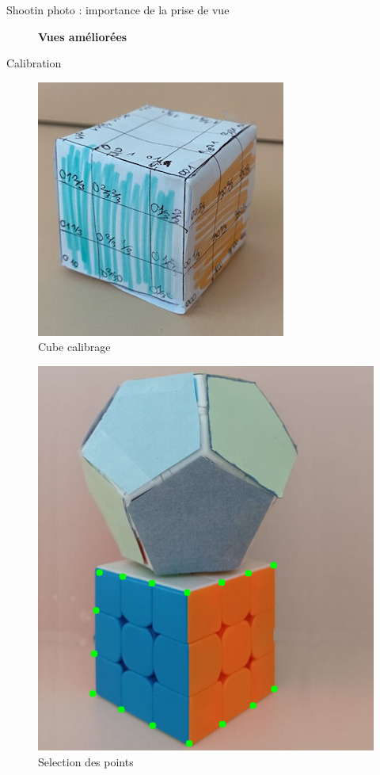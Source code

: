 \begin{frame}{Shootin photo : importance de la prise de vue}
\begin{minipage}{0.48\linewidth}
\begin{figure}
      {\footnotesize\textbf{Vues améliorées}}
    \end{figure}
  \end{minipage}
\end{frame}


\begin{frame}{Calibration}
 \centering
  \begin{minipage}{0.48\linewidth}
    \centering
    \begin{figure}
      \centering
      \includegraphics[width=0.7\linewidth]{capture/cube_calibrage.jpg}%
      \caption{Cube calibrage}
    \end{figure}
  \end{minipage}
  \hfill
  \begin{minipage}{0.48\linewidth}
    \centering
    \begin{figure}
      \centering
      \includegraphics[width=0.8\linewidth]{capture/selection.png}%
      \caption{Selection des points}
    \end{figure}
  \end{minipage}
\end{frame}


